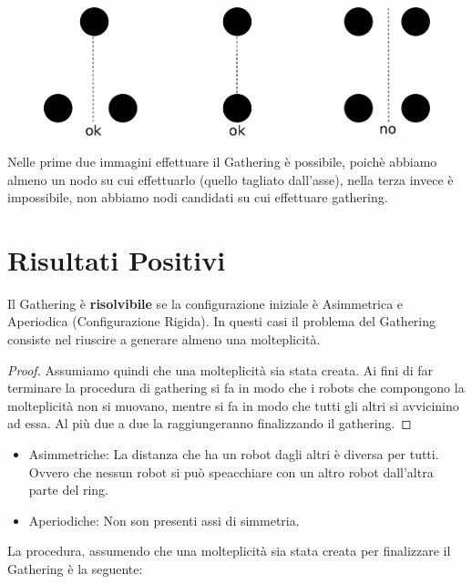 \begin{figure}[H]
    \centering
    \includegraphics[scale=0.7]{images/n_48}
\end{figure}

Nelle prime due immagini effettuare il Gathering è possibile, poichè abbiamo
almeno un nodo su cui effettuarlo (quello tagliato dall'asse), nella terza
invece è impossibile, non abbiamo nodi candidati su cui effettuare gathering.

\section{Risultati Positivi}
\begin{theorem}
    Il Gathering è \textbf{risolvibile} se la configurazione iniziale è
    Asimmetrica e Aperiodica (Configurazione Rigida). In questi casi il problema del
    Gathering consiste nel riuscire a generare almeno una molteplicità.
\end{theorem}

\begin{proof}
    Assumiamo quindi che una molteplicità sia stata creata. Ai fini di far
    terminare la procedura di gathering si fa in modo che i robots che compongono
    la molteplicità non si muovano, mentre si fa in modo che tutti gli altri si
    avvicinino ad essa. Al più due a due la raggiungeranno finalizzando il
    gathering.
\end{proof}

\begin{itemize}
    \item Asimmetriche: La distanza che ha un robot dagli altri è diversa per
          tutti. Ovvero che nessun robot si può speacchiare con un altro robot
          dall'altra parte del ring.
    \item Aperiodiche: Non son presenti assi di simmetria.
\end{itemize}

La procedura, assumendo che una molteplicità sia stata creata per finalizzare il
Gathering è la seguente:

